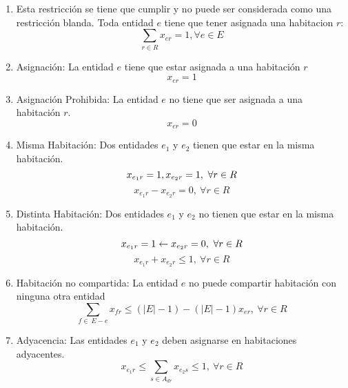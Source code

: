 \documentclass[letter, 10pt]{article}
\begin{document}
\begin{enumerate}
    \item Esta restricci\'on se tiene que cumplir y no puede ser considerada como una restricci\'on blanda.
    Toda entidad $e$ tiene que tener asignada una habitacion $r$:
    \begin{equation}
    \sum_{r \in R} x_{er}= 1, \forall e \in E 
    \end{equation}
    \item Asignaci\'on: La entidad $e$ tiene que estar asignada a una habitaci\'on $r$
    \begin{equation}
        x_{er} = 1
    \end{equation}
    \item Asignaci\'on Prohibida: La entidad $e$ no tiene que ser asignada a una habitaci\'on $r$.
    \begin{equation}
        x_{er} = 0
    \end{equation}
    \item Misma Habitaci\'on: Dos entidades $e_1$ y $e_2$ tienen que estar en la misma habitaci\'on.
    \begin{equation}
        x_{e_1r} = 1, x_{e_2r} = 1, \ \forall r \in R 
        \notag
    \end{equation}
    \begin{equation}
        x_{e_1r} - x_{e_2r} = 0, \ \forall r \in R 
    \end{equation}
    \item Distinta Habitaci\'on: Dos entidades $e_1$ y $e_2$ no tienen que estar en la misma habitaci\'on.
    \begin{equation}
        x_{e_1r} = 1 \leftarrow x_{e_2r} = 0, \ \forall r \in R 
        \notag
    \end{equation}
    \begin{equation}
        x_{e_1r} + x_{e_2r} \leq 1, \ \forall r \in R 
    \end{equation}
    \item Habitaci\'on no compartida: La entidad $e$ no puede compartir habitaci\'on con ninguna otra entidad
    \begin{equation}
    \sum_{f \in \ E-e} x_{fr} \leq (|E|-1) - (|E|-1)x_{er}, \ \forall r \in R 
    \end{equation}
    \item Adyacencia: Las entidades $e_1$ y $e_2$ deben asignarse en habitaciones adyacentes.
    \begin{equation}
        x_{e_1r} \leq \sum_{s \in A_{dr} } x_{e_2s} \leq 1, \ \forall r \in R 

\end{equation}
\end{enumerate}
\end{document}
